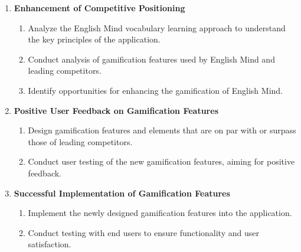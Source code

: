 \begin{enumerate}
    \item \textbf{Enhancement of Competitive Positioning}
    \begin{enumerate}
        \item Analyze the English Mind vocabulary learning approach to understand the key principles of the application.
        \item Conduct analysis of gamification features used by English Mind and leading competitors.
        \item Identify opportunities for enhancing the gamification of English Mind.
    \end{enumerate}

    \item \textbf{Positive User Feedback on Gamification Features}
    \begin{enumerate}
        \item Design gamification features and elements that are on par with or surpass those of leading competitors.
        \item Conduct user testing of the new gamification features, aiming for positive feedback.
    \end{enumerate}

    \item \textbf{Successful Implementation of Gamification Features}
    \begin{enumerate}
        \item Implement the newly designed gamification features into the application.
        \item Conduct testing with end users to ensure functionality and user satisfaction.
    \end{enumerate}
\end{enumerate}
